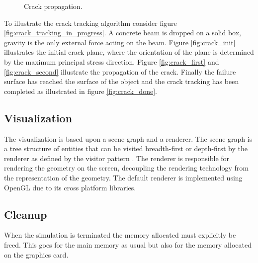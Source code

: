 \begin{figure}
\begin{minipage}[b]{0.5\linewidth}
    \centering
  \end{minipage}
  \caption{Crack propagation.}
  \label{fig:crack_tracking_in_progress}
\end{figure}

To illustrate the crack tracking algorithm consider figure
\vref{fig:crack_tracking_in_progress}. A concrete beam is
dropped on a solid box, gravity is the only external force
acting on the beam. Figure \vref{fig:crack_init} illustrates the
initial crack plane, where the orientation of the
plane is determined by the maximum principal stress direction.
%
Figure \ref{fig:crack_first} and \vref{fig:crack_second} illustrate
the propagation of the crack. Finally the failure surface has reached
the surface
of the object and the crack tracking has been completed as illustrated
in figure \vref{fig:crack_done}. 

\subsection*{Visualization}
The visualization is based
upon a scene graph and a renderer. The scene graph is a tree structure
of entities that can be visited breadth-first or depth-first by the
renderer as defined by the visitor pattern
. The renderer is responsible for rendering 
the geometry on the screen, decoupling the rendering technology from
the representation of the geometry. The default renderer is
implemented using OpenGL due to its
cross platform libraries. 



\subsection*{Cleanup}
When the simulation is terminated the memory allocated must explicitly
be freed. This goes for the main memory as usual but also for the
memory allocated on the graphics card. 

